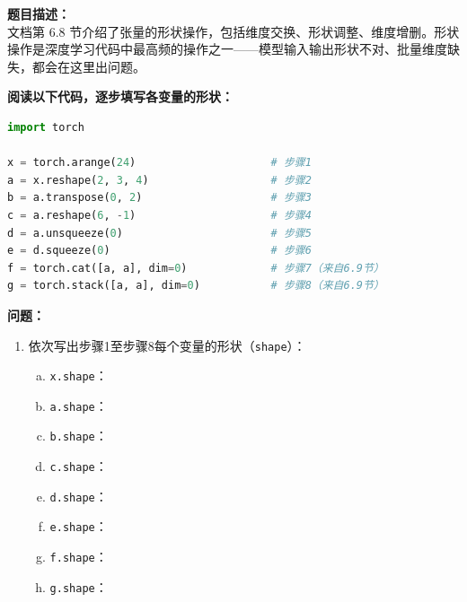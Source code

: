 \documentclass[a4paper,11pt]{ctexart}
\begin{document}
\begin{problembox}
    \textbf{题目描述：}\\
    文档第 6.8 节介绍了张量的形状操作，包括维度交换、形状调整、维度增删。形状操作是深度学习代码中最高频的操作之一——模型输入输出形状不对、批量维度缺失，都会在这里出问题。

    \vspace{0.3cm}
    \textbf{阅读以下代码，逐步填写各变量的形状：}
    \begin{lstlisting}[language=Python]
import torch

x = torch.arange(24)                     # 步骤1
a = x.reshape(2, 3, 4)                   # 步骤2
b = a.transpose(0, 2)                    # 步骤3
c = a.reshape(6, -1)                     # 步骤4
d = a.unsqueeze(0)                       # 步骤5
e = d.squeeze(0)                         # 步骤6
f = torch.cat([a, a], dim=0)             # 步骤7（来自6.9节）
g = torch.stack([a, a], dim=0)           # 步骤8（来自6.9节）
    \end{lstlisting}

    \textbf{问题：}
    \begin{enumerate}[(1)]
        \item 依次写出步骤1至步骤8每个变量的形状（\texttt{shape}）：
        \begin{enumerate}[a.]
            \item \texttt{x.shape}：\underline{\hspace{4cm}}
            \item \texttt{a.shape}：\underline{\hspace{4cm}}
            \item \texttt{b.shape}：\underline{\hspace{4cm}}
            \item \texttt{c.shape}：\underline{\hspace{4cm}}
            \item \texttt{d.shape}：\underline{\hspace{4cm}}
            \item \texttt{e.shape}：\underline{\hspace{4cm}}
            \item \texttt{f.shape}：\underline{\hspace{4cm}}
            \item \texttt{g.shape}：\underline{\hspace{4cm}}
        \end{enumerate}


\end{enumerate}
\end{problembox}
\end{document}
